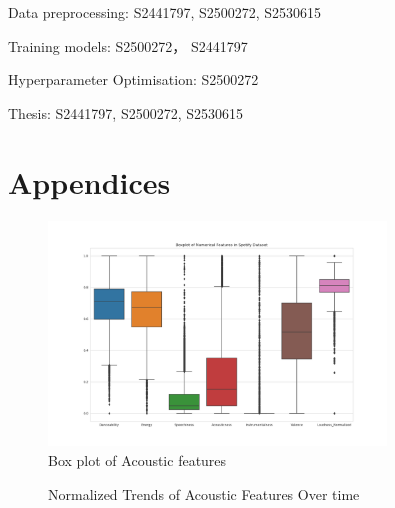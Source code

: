\documentclass{article}
\begin{document}
    Data preprocessing: S2441797, S2500272, S2530615
    
    Training models: S2500272， S2441797
    
    Hyperparameter Optimisation: S2500272
    
    Thesis: S2441797, S2500272, S2530615
    
\newpage
\section*{Appendices}

\begin{figure}[h] %
  \centering
  \includegraphics[width=0.8\textwidth]{boxplot.png}
  \captionsetup{labelformat=default}
  \caption{Box plot of Acoustic features}
  \label{fig:boxplot}
\end{figure}


\begin{figure}[h]
  \centering
  
  \captionsetup{labelformat=default}
  \caption{Normalized Trends of Acoustic Features Over time}
  \label{fig:feature_trends}
\end{figure}
\end{document}
